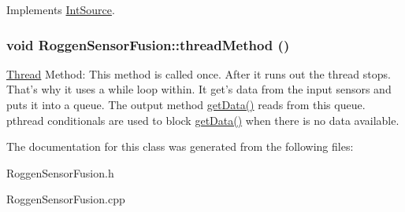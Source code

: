 Implements \hyperlink{classIntSource}{IntSource}.\hypertarget{classRoggenSensorFusion_a2d36e7e447102dbd505440489ebbedbc}{
\subsubsection[{threadMethod}]{\setlength{\rightskip}{0pt plus 5cm}void RoggenSensorFusion::threadMethod ()}}
\label{classRoggenSensorFusion_a2d36e7e447102dbd505440489ebbedbc}
\hyperlink{classThread}{Thread} Method: This method is called once. After it runs out the thread stops. That's why it uses a while loop within. It get's data from the input sensors and puts it into a queue. The output method \hyperlink{classRoggenSensorFusion_adbf5ec2917eea50f83ae836213e03c5c}{getData()} reads from this queue. pthread conditionals are used to block \hyperlink{classRoggenSensorFusion_adbf5ec2917eea50f83ae836213e03c5c}{getData()} when there is no data available. 

The documentation for this class was generated from the following files:\begin{DoxyCompactItemize}
\item 
RoggenSensorFusion.h\item 
RoggenSensorFusion.cpp\end{DoxyCompactItemize}
